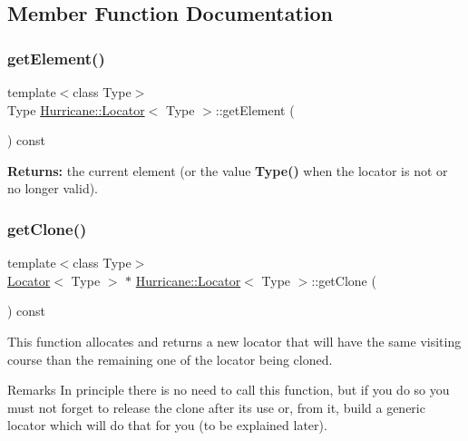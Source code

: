 \subsection{Member Function Documentation}
\mbox{\label{classHurricane_1_1Locator_aa2202b4cf461a7c3b666da10bc96219f}} 
\subsubsection{\texorpdfstring{get\+Element()}{getElement()}}
{\footnotesize\ttfamily template$<$class Type$>$ \\
Type \mbox{\hyperlink{classHurricane_1_1Locator}{Hurricane\+::\+Locator}}$<$ Type $>$\+::get\+Element (\begin{DoxyParamCaption}{ }\end{DoxyParamCaption}) const\hspace{0.3cm}{\ttfamily [pure virtual]}}

{\bfseries Returns\+:} the current element (or the value {\bfseries Type()} when the locator is not or no longer valid). \mbox{\label{classHurricane_1_1Locator_a83779aa300e3de011bf3b93be8a48d83}} 
\subsubsection{\texorpdfstring{get\+Clone()}{getClone()}}
{\footnotesize\ttfamily template$<$class Type$>$ \\
\mbox{\hyperlink{classHurricane_1_1Locator}{Locator}}$<$ Type $>$ $\ast$ \mbox{\hyperlink{classHurricane_1_1Locator}{Hurricane\+::\+Locator}}$<$ Type $>$\+::get\+Clone (\begin{DoxyParamCaption}{ }\end{DoxyParamCaption}) const\hspace{0.3cm}{\ttfamily [pure virtual]}}

This function allocates and returns a new locator that will have the same visiting course than the remaining one of the locator being cloned.

\begin{DoxyRemark}{Remarks}
In principle there is no need to call this function, but if you do so you must not forget to release the clone after its use or, from it, build a generic locator which will do that for you (to be explained later). 
\end{DoxyRemark}
\mbox{\label{classHurricane_1_1Locator_abb6e5255372e22e31bf0a8e4cae93f87}} 

